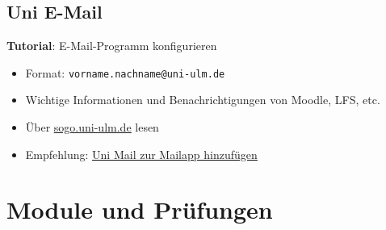 \documentclass[
	aspectratio=169, 
	10pt 
]{beamer}
\begin{document}
\subsection{Uni E-Mail}
\begin{frame}{\insertsubsection}
    \begin{fancycolumns}[T, widths={30}]
        \begin{center}
            \textbf{Tutorial}: E-Mail-Programm konfigurieren
        \end{center}    
        \nextcolumn
        \begin{itemize}
            \item Format: \lstinline|vorname.nachname@uni-ulm.de|
            \item Wichtige Informationen und Benachrichtigungen von Moodle, LFS, etc.
            \item Über \underline{\href{https://sogo.uni-ulm.de}{sogo.uni-ulm.de}} lesen
            \item Empfehlung: \underline{\href{https://www.uni-ulm.de/einrichtungen/kiz/service-katalog/e-mail-kalender-zusammenarbeit/e-mail/e-mail-programme-konfigurieren/}{Uni Mail zur Mailapp hinzufügen}}
        \end{itemize}
    \end{fancycolumns}
\end{frame}

\section{Module und Prüfungen}
\end{document}
